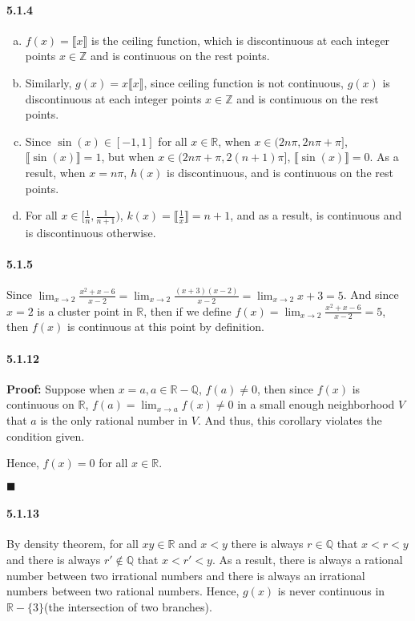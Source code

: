 \documentclass[11pt]{article}
\newcommand{\qed}{
	\begin{flushright}
		$\blacksquare$
	\end{flushright}}
\begin{document}
	\paragraph{5.1.4}
		\begin{enumerate}[(a)]
			\item $f(x) = \llbracket x\rrbracket$ is the ceiling function, which is discontinuous at each integer points $x \in \mathbb{Z}$ and is continuous on the rest points.
			\item Similarly, $g(x) = x\llbracket x \rrbracket$, since ceiling function is not continuous, $g(x)$ is discontinuous at each integer points $x \in \mathbb{Z}$ and is continuous on the rest points.
			\item Since $\sin(x) \in [-1, 1]$ for all $x \in \mathbb{R}$, when $x \in (2n\pi, 2n\pi + \pi]$, $\llbracket \sin(x)\rrbracket = 1$, but when $x \in (2n\pi + \pi, 2(n + 1)\pi]$, $\llbracket \sin(x)\rrbracket = 0$. As a result, when $x = n\pi$, $h(x)$ is discontinuous, and is continuous on the rest points.
			\item For all $x \in [\frac{1}{n}, \frac{1}{n + 1})$, $k(x) = \llbracket \frac{1}{x}\rrbracket = n + 1$, and as a result, is continuous and is discontinuous otherwise.
		\end{enumerate}
	\paragraph{5.1.5}
		Since $\lim_{x \rightarrow 2} \frac{x^2 + x - 6}{x - 2} = \lim_{x \rightarrow 2} \frac{(x + 3)(x - 2)}{x - 2} =  \lim_{x \rightarrow 2} x + 3 = 5$. And since $x = 2$ is a cluster point in $\mathbb{R}$, then if we define $f(x) = \lim_{x \rightarrow 2} \frac{x^2 + x - 6}{x - 2} = 5$, then $f(x)$ is continuous at this point by definition.
	\paragraph{5.1.12}\textbf{Proof:} Suppose when $x = a, a \in \mathbb{R - Q}$, $f(a) \neq 0$, then since $f(x)$ is continuous on $\mathbb{R}$, $f(a) = \lim_{x \rightarrow a} f(x) \neq 0$ in a small enough neighborhood $V$ that $a$ is the only rational number in $V$. And thus, this corollary violates the condition given.
	
	Hence, $f(x) = 0$ for all $x \in \mathbb{R}$.
	\qed 
	\paragraph{5.1.13} By density theorem, for all $x y \in \mathbb{R}$ and $x < y$ there is always $r \in \mathbb{Q}$ that $x < r < y$ and there is always $r' \notin \mathbb{Q}$ that $x < r' < y$. As a result, there is always a rational number between two irrational numbers and there is always an irrational numbers between two rational numbers. Hence, $g(x)$ is never continuous in $\mathbb{R} - \{3\}$(the intersection of two branches).
	
\end{document}
